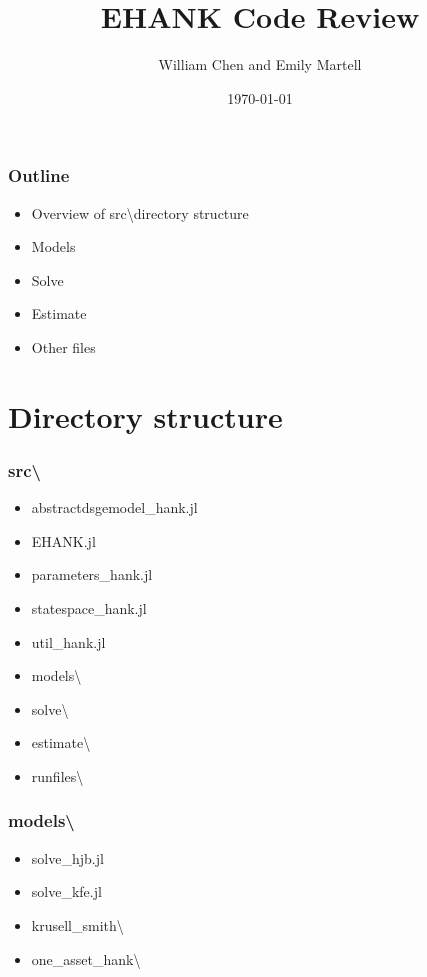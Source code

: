 \documentclass{beamer}
\begin{document}
\title{EHANK Code Review}
\author{William Chen and Emily Martell}
\date{\today}

\begin{frame}
\titlepage
\end{frame}

\begin{frame}
\frametitle{Outline}
\begin{itemize}
\item Overview of src\textbackslash directory structure
\item Models
\item Solve
\item Estimate
\item Other files
\end{itemize}
\end{frame}

\section{Directory structure}
\begin{frame}
\frametitle{src\textbackslash}
\begin{itemize}
  \item abstractdsgemodel\_hank.jl
  \item EHANK.jl
  \item parameters\_hank.jl
  \item statespace\_hank.jl
  \item util\_hank.jl
  \item models\textbackslash
  \item solve\textbackslash
  \item estimate\textbackslash
  \item runfiles\textbackslash
\end{itemize}
\end{frame}

\begin{frame}
\frametitle{models\textbackslash}
  \begin{itemize}
    \item solve\_hjb.jl
    \item solve\_kfe.jl
    \item krusell\_smith\textbackslash
    \item one\_asset\_hank\textbackslash
  \end{itemize}
\end{frame}
\end{document}
